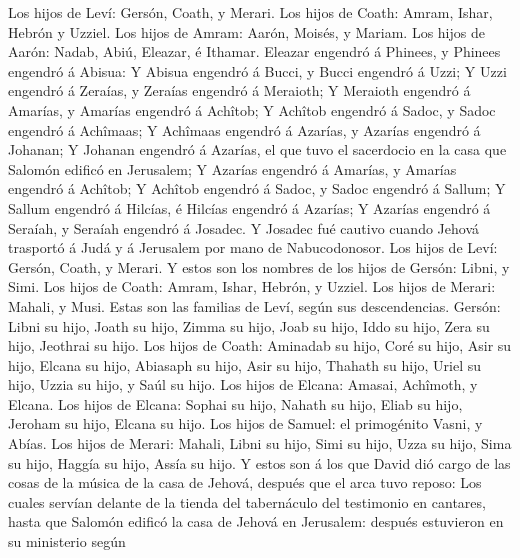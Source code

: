  Los hijos de Leví: Gersón, Coath, y Merari.
 Los hijos de Coath: Amram, Ishar, Hebrón y Uzziel.
 Los hijos de Amram: Aarón, Moisés, y Mariam. Los hijos de
Aarón: Nadab, Abiú, Eleazar, é Ithamar.  Eleazar engendró
á Phinees, y Phinees engendró á Abisua:  Y Abisua engendró
á Bucci, y Bucci engendró á Uzzi;  Y Uzzi engendró á
Zeraías, y Zeraías engendró á Meraioth;  Y Meraioth
engendró á Amarías, y Amarías engendró á Achîtob;  Y
Achîtob engendró á Sadoc, y Sadoc engendró á Achîmaas;  Y
Achîmaas engendró á Azarías, y Azarías engendró á Johanan;
 Y Johanan engendró á Azarías, el que tuvo el sacerdocio
en la casa que Salomón edificó en Jerusalem;  Y Azarías
engendró á Amarías, y Amarías engendró á Achîtob;  Y
Achîtob engendró á Sadoc, y Sadoc engendró á Sallum;  Y
Sallum engendró á Hilcías, é Hilcías engendró á Azarías; 
Y Azarías engendró á Seraíah, y Seraíah engendró á Josadec.
 Y Josadec fué cautivo cuando Jehová trasportó á Judá y á
Jerusalem por mano de Nabucodonosor.  Los hijos de Leví:
Gersón, Coath, y Merari.  Y estos son los nombres de los
hijos de Gersón: Libni, y Simi.  Los hijos de Coath:
Amram, Ishar, Hebrón, y Uzziel.  Los hijos de Merari:
Mahali, y Musi. Estas son las familias de Leví, según sus descendencias.
 Gersón: Libni su hijo, Joath su hijo, Zimma su hijo,
 Joab su hijo, Iddo su hijo, Zera su hijo, Jeothrai su
hijo.  Los hijos de Coath: Aminadab su hijo, Coré su
hijo, Asir su hijo,  Elcana su hijo, Abiasaph su hijo,
Asir su hijo,  Thahath su hijo, Uriel su hijo, Uzzia su
hijo, y Saúl su hijo.  Los hijos de Elcana: Amasai,
Achîmoth, y Elcana.  Los hijos de Elcana: Sophai su hijo,
Nahath su hijo,  Eliab su hijo, Jeroham su hijo, Elcana
su hijo.  Los hijos de Samuel: el primogénito Vasni, y
Abías.  Los hijos de Merari: Mahali, Libni su hijo, Simi
su hijo, Uzza su hijo,  Sima su hijo, Haggía su hijo,
Assía su hijo.  Y estos son á los que David dió cargo de
las cosas de la música de la casa de Jehová, después que el arca tuvo
reposo:  Los cuales servían delante de la tienda del
tabernáculo del testimonio en cantares, hasta que Salomón edificó la
casa de Jehová en Jerusalem: después estuvieron en su ministerio según
